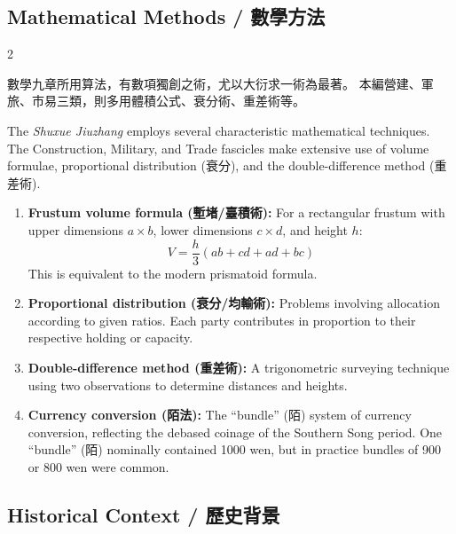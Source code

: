 \documentclass[11pt,a4paper]{article}
\begin{document}
\subsection*{Mathematical Methods / 數學方法}

\begin{paracol}{2}

數學九章所用算法，有數項獨創之術，尤以大衍求一術為最著。
本編營建、軍旅、市易三類，則多用體積公式、衰分術、重差術等。

\switchcolumn

The \textit{Shuxue Jiuzhang} employs several characteristic
mathematical techniques. The Construction, Military, and Trade fascicles
make extensive use of volume formulae, proportional distribution
(衰分), and the double-difference method (重差術).

\end{paracol}

\vspace{0.5em}

\begin{enumerate}
  \item \textbf{Frustum volume formula (塹堵/臺積術):} For a rectangular frustum
  with upper dimensions $a \times b$, lower dimensions $c \times d$, and height $h$:
  \[
  V = \frac{h}{3}(ab + cd + ad + bc)
  \]
  This is equivalent to the modern prismatoid formula.

  \item \textbf{Proportional distribution (衰分/均輸術):} Problems involving
  allocation according to given ratios. Each party contributes in proportion
to their respective holding or capacity.

  \item \textbf{Double-difference method (重差術):} A trigonometric surveying
technique using two observations to determine distances and heights.

  \item \textbf{Currency conversion (陌法):} The ``bundle'' (陌) system of
currency conversion, reflecting the debased coinage of the Southern Song
period. One ``bundle'' (陌) nominally contained 1000 wen, but in practice
bundles of 900 or 800 wen were common.
\end{enumerate}

\subsection*{Historical Context / 歷史背景}
\end{document}
